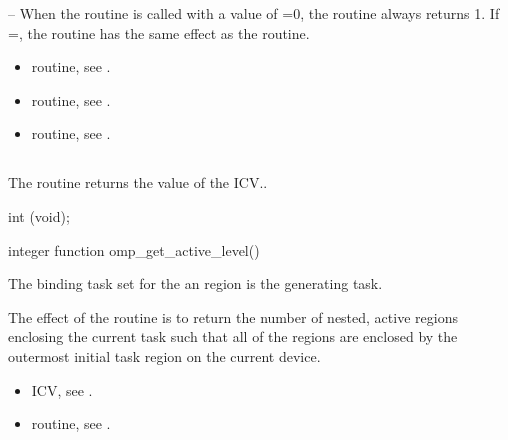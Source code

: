\notestart
\noteheader -- When the  routine is called with a value of =0, 
the routine always returns 1. If =, the routine has the same 
effect as the\linebreak {} routine. 
\noteend

\crossreferences
\begin{itemize}
\item {} routine, see 
.

\item {} routine, see 
.

\item {} routine, see 
.
\end{itemize}









\subsection{}
\label{subsec:omp_get_active_level}
\summary
The  routine returns the value of the  ICV..

\format
\ccppspecificstart
\begin{boxedcode}
int (void);
\end{boxedcode}
\ccppspecificend

\pagebreak
\fortranspecificstart
\begin{boxedcode}
integer function omp\_get\_active\_level()
\end{boxedcode}
\fortranspecificend

\binding
The binding task set for the an  region is the generating 
task. 

\effect
The effect of the  routine is to return the number of nested, 
active  regions enclosing the current task such that all of the  
regions are enclosed by the outermost initial task region on the current device. 

\crossreferences
\begin{itemize}
\item {} ICV, see 
.

\item {} routine, see 
. 
\end{itemize}











